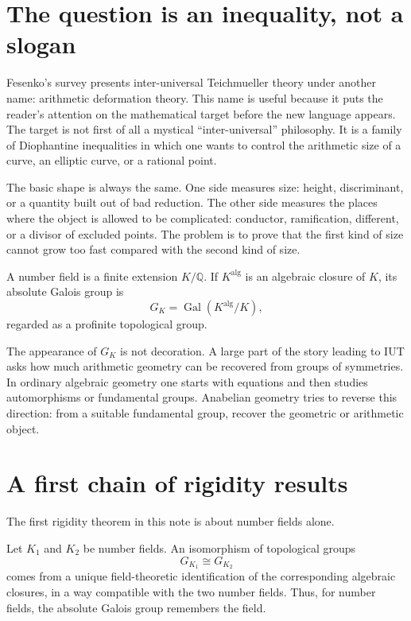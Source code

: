 
\section{The question is an inequality, not a slogan}

Fesenko's survey presents inter-universal Teichmueller theory under another name: arithmetic deformation theory.  This name is useful because it puts the reader's attention on the mathematical target before the new language appears.  The target is not first of all a mystical ``inter-universal'' philosophy.  It is a family of Diophantine inequalities in which one wants to control the arithmetic size of a curve, an elliptic curve, or a rational point.

The basic shape is always the same.  One side measures size: height, discriminant, or a quantity built out of bad reduction.  The other side measures the places where the object is allowed to be complicated: conductor, ramification, different, or a divisor of excluded points.  The problem is to prove that the first kind of size cannot grow too fast compared with the second kind of size.

\begin{definition}
A number field is a finite extension \(K/\mathbb Q\).  If \(K^{\mathrm{alg}}\) is an algebraic closure of \(K\), its absolute Galois group is
\[
  G_K=\operatorname{Gal}(K^{\mathrm{alg}}/K),
\]
regarded as a profinite topological group.
\end{definition}

The appearance of \(G_K\) is not decoration.  A large part of the story leading to IUT asks how much arithmetic geometry can be recovered from groups of symmetries.  In ordinary algebraic geometry one starts with equations and then studies automorphisms or fundamental groups.  Anabelian geometry tries to reverse this direction: from a suitable fundamental group, recover the geometric or arithmetic object.

\section{A first chain of rigidity results}

The first rigidity theorem in this note is about number fields alone.

\begin{theorem}
Let \(K_1\) and \(K_2\) be number fields.  An isomorphism of topological groups
\[
  G_{K_1}\cong G_{K_2}
\]
comes from a unique field-theoretic identification of the corresponding algebraic closures, in a way compatible with the two number fields.  Thus, for number fields, the absolute Galois group remembers the field.
\end{theorem}


